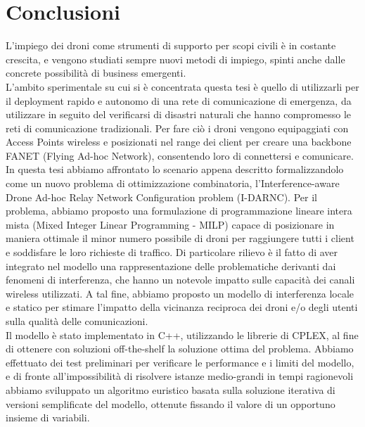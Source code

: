  \chapter{Conclusioni} \label{chap:conclusioni}

\ifpdf
    \graphicspath{{Chapter8/Figs/Raster/}{Chapter8/Figs/PDF/}{Chapter8/Figs/}}
\else
    \graphicspath{{Chapter8/Figs/Vector/}{Chapter8/Figs/}}
\fi

L'impiego dei droni come strumenti di supporto per scopi civili è in costante crescita, e vengono studiati sempre nuovi metodi di impiego, spinti anche dalle concrete possibilità di business emergenti. \\
L'ambito sperimentale su cui si è concentrata questa tesi è quello di utilizzarli per il deployment rapido e autonomo di una rete di comunicazione di emergenza, da utilizzare in seguito del verificarsi di disastri naturali che hanno compromesso le reti di comunicazione tradizionali.
Per fare ciò i droni vengono equipaggiati con Access Points wireless e posizionati nel range dei client per creare una backbone FANET (Flying Ad-hoc Network), consentendo loro di connettersi e comunicare. \\
In questa tesi abbiamo affrontato lo scenario appena descritto formalizzandolo come un nuovo problema di ottimizzazione combinatoria, l'Interference-aware Drone Ad-hoc Relay Network Configuration problem (I-DARNC). Per il problema, abbiamo proposto una formulazione di programmazione lineare intera mista (Mixed Integer Linear Programming - MILP) capace di posizionare in maniera ottimale il minor numero possibile di droni per raggiungere tutti i client e soddisfare le loro richieste di traffico. Di particolare rilievo è il fatto di aver integrato nel modello una rappresentazione delle problematiche derivanti dai fenomeni di interferenza, che hanno un notevole impatto sulle capacità dei canali wireless utilizzati. A tal fine, abbiamo proposto un modello di interferenza locale e statico per stimare l'impatto della vicinanza reciproca dei droni e/o degli utenti sulla qualità delle comunicazioni. \\
Il modello è stato implementato in C++, utilizzando le librerie di CPLEX, al fine di ottenere con soluzioni off-the-shelf la soluzione ottima del problema. Abbiamo effettuato dei test preliminari per verificare le performance e i limiti del modello, e di fronte all'impossibilità di risolvere istanze medio-grandi in tempi ragionevoli abbiamo sviluppato un algoritmo euristico basata sulla soluzione iterativa di versioni semplificate del modello, ottenute fissando il valore di un opportuno insieme di variabili. \\
